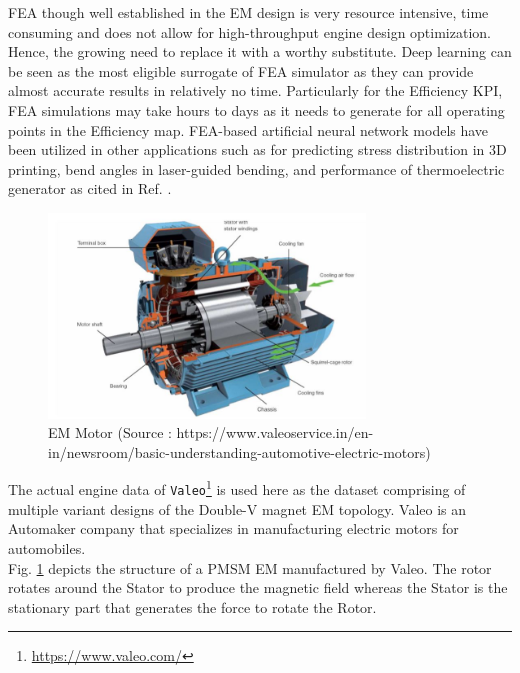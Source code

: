\documentclass{report} %
\begin{document}
\ac{FEA} though well established in the \ac{EM} design is very resource intensive, time consuming and does not allow for high-throughput engine design optimization. 
Hence, the growing need to replace it with a worthy substitute.
Deep learning can be seen as the most eligible surrogate of \ac{FEA} simulator as they can provide almost accurate results in relatively no time. 
Particularly for the Efficiency \ac{KPI}, \ac{FEA} simulations may take hours to days as it needs to generate for all operating points in the Efficiency map.
\ac{FEA}-based artificial neural network models have been utilized in other applications such as for predicting stress distribution in 3D printing, bend angles in laser-guided bending, 
and performance of thermoelectric generator as cited in Ref. \cite{SM EMT-2020}.\\
   
\begin{figure}[H]
    \centering
    \includegraphics[width=0.75\textwidth]{./ReportImages/ValeoMotorStructure.jpg} 
    \caption{\ac{EM} Motor (Source : https://www.valeoservice.in/en-in/newsroom/basic-understanding-automotive-electric-motors)}
    \label{fig:Valeo Motor Structure}
\end{figure}

The actual engine data of \texttt{Valeo}\footnote{\url{https://www.valeo.com/}} is used here as the dataset comprising of multiple variant designs of the Double-V 
magnet \ac{EM} topology. Valeo is an Automaker company that specializes in manufacturing electric motors for automobiles.\\
Fig. \ref{fig:Valeo Motor Structure} depicts the structure of a \ac{PMSM} \ac{EM} manufactured by Valeo. 
The rotor rotates around the Stator to produce the magnetic field whereas the Stator is the stationary part that generates the force to rotate the Rotor.\\
\end{document}
